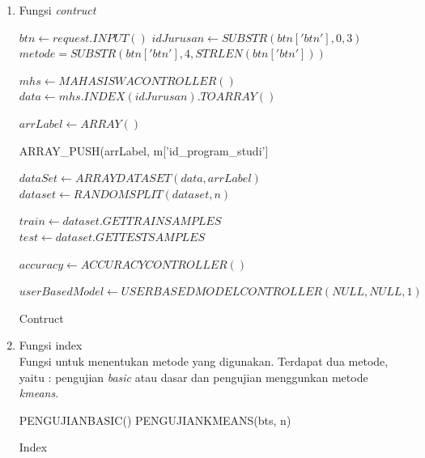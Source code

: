 \begin{enumerate}
    \item Fungsi \textit{contruct}\\
        
        \begin{algorithm}[H]
            \begin{algorithmic}[1]
                   \State $btn \gets request.INPUT()$
                   \State $idJurusan \gets SUBSTR(btn['btn'], 0, 3)$
                   \State $metode = SUBSTR(btn['btn'], 4, STRLEN(btn['btn']))$
                   
                   \State $mhs \gets MAHASISWACONTROLLER()$
                   \State $data \gets mhs.INDEX(idJurusan).TOARRAY()$
                   
                   \State $arrLabel \gets ARRAY()$ 
                   
                        \State ARRAY\_PUSH(arrLabel, m['id\_program\_studi']
                   \EndFor
                   
                   \State $dataSet \gets ARRAYDATASET(data, arrLabel)$
                   \State $dataset \gets RANDOMSPLIT(dataset, n)$ 
                   
                   \State $train \gets dataset.GETTRAINSAMPLES$
                   \State $test \gets dataset.GETTESTSAMPLES$
                   
                   \State $accuracy \gets ACCURACYCONTROLLER()$
                   
                   \State $userBasedModel \gets USERBASEDMODELCONTROLLER(NULL, NULL, 1)$
                \EndProcedure
            \end{algorithmic} 
            \caption{Contruct}
            \label{alg:contruct pengujian}
        \end{algorithm}

    \item Fungsi index\\
        Fungsi untuk menentukan metode yang digunakan. Terdapat dua metode, yaitu : pengujian \textit{basic} atau dasar dan pengujian menggunkan metode \textit{kmeans}. \\
        
        \begin{algorithm}[H]
            \begin{algorithmic}[1]
                        \State \Return PENGUJIANBASIC()
                   \Else
                        \State \Return PENGUJIANKMEANS(bts, n)
                   \EndIf
                \EndProcedure
            \end{algorithmic} 
            \caption{Index}
            \label{alg:index}
        \end{algorithm}
    

\end{enumerate}

